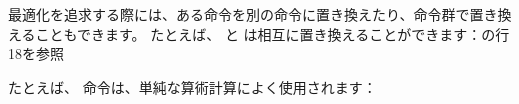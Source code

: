 ﻿最適化を追求する際には、ある命令を別の命令に置き換えたり、命令群で置き換えることもできます。
たとえば、 \ADD と \SUB は相互に置き換えることができます：の行18を参照

たとえば、 \LEA 命令は、単純な算術計算によく使用されます：




